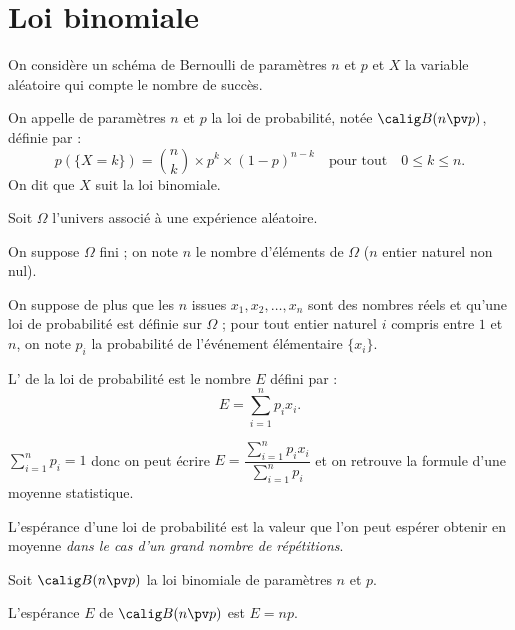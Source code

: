 \documentclass[10pt,openright,twoside,french]{book}
\begin{document}
\section{Loi binomiale}

\begin{Defi}
    On considère un schéma de Bernoulli de paramètres $n$ et $p$ et $X$ la variable aléatoire qui compte le nombre de succès.\par
    On appelle  de paramètres $n$ et $p$ la loi de probabilité, notée $\calig B(n\pv p)$, définie par :
    \[p(\{X = k\}) = \binom n k \times p^k \times (1-p)^{n - k} \quad \text{pour tout}\quad 0 \leq k \leq n.\]
    On dit que $X$ suit la loi binomiale.
\end{Defi}

\begin{Defi}
    Soit $\Omega$ l'univers associé à une expérience aléatoire.\par
    On suppose $\Omega$ fini ; on note $n$ le nombre d'éléments de $\Omega$ ($n$ entier naturel non nul).\par
    On suppose de plus que les $n$ issues $x_1, x_2, \ldots, x_n$ sont des nombres réels et qu'une loi de probabilité est définie sur $\Omega$ ; pour tout entier naturel $i$ compris entre $1$ et $n$, on note $p_i$ la probabilité de l'événement élémentaire $\{x_i\}$.\par
    L' de la loi de probabilité est le nombre $E$ défini par : \[E = \sum_{i = 1}^n p_i x_i.\]
\end{Defi}

\begin{Rmq}
    $\sum_{i = 1}^n p_i = 1$ donc on peut écrire $E = \dfrac{\sum_{i = 1}^n p_i x_i}{\sum_{i = 1}^n p_i}$ et on retrouve la formule d'une moyenne statistique.\par
    L'espérance d'une loi de probabilité est la valeur que l'on peut espérer obtenir en moyenne \textit{dans le cas d'un grand nombre de répétitions}.
\end{Rmq}

\begin{Prop}
    Soit $\calig B(n \pv p)$ la loi binomiale de paramètres $n$ et $p$.\par
    L'espérance $E$ de $\calig B(n \pv p)$ est $E = np$.
\end{Prop}
\end{document}
